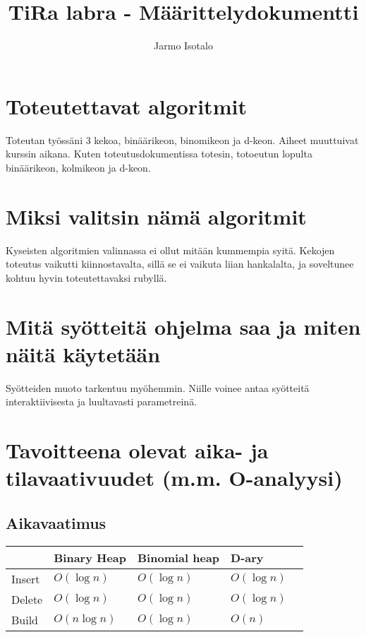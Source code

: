 \documentclass[a4paper,12pt]{article}
\begin{document}
\title{TiRa labra - Määrittelydokumentti} 
\author{Jarmo Isotalo}
\maketitle

\section{Toteutettavat algoritmit}

Toteutan työssäni 3 kekoa, binäärikeon, binomikeon ja d-keon.
Aiheet muuttuivat kurssin aikana. Kuten toteutusdokumentissa totesin, totoeutun lopulta binäärikeon, kolmikeon ja d-keon.

\section{Miksi valitsin nämä algoritmit}

Kyseisten algoritmien valinnassa ei ollut mitään kummempia syitä. Kekojen toteutus vaikutti
kiinnostavalta, sillä se ei vaikuta liian hankalalta, ja soveltunee kohtuu hyvin toteutettavaksi rubyllä.

\section{Mitä syötteitä ohjelma saa ja miten näitä käytetään}
Syötteiden muoto tarkentuu myöhemmin. 
Niille voinee antaa syötteitä interaktiivisesta ja luultavasti parametreinä.

\section{Tavoitteena olevat aika- ja tilavaativuudet (m.m. O-analyysi)}

\subsection{Aikavaatimus}
\begin{tabular}{|l|l|l|l|l|}
\hline
&Binary Heap & Binomial heap & D-ary \\\hline
Insert & $O (\log n)$ & $O (\log n)$ & $O (\log n)$\\\hline
Delete  & $O (\log n)$ & $O (\log n)$ & $O (\log n)$\\\hline
Build & $O (n \log n)$ & $O (\log n)$ & $O (n)$\\\hline
\end{tabular}
\end{document}
